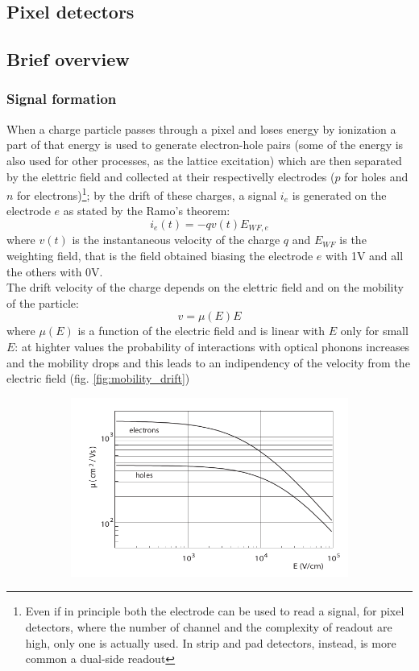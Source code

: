 \label{chip}
\begin{titlepage}

\section{Pixel detectors}

\subsection{Brief overview}
\subsubsection{Signal formation}
When a charge particle passes through a pixel and loses energy by ionization a part of that energy is used to generate electron-hole pairs (some of the energy is also used for other processes, as the lattice excitation) which are then separated by the elettric field and collected at their respectivelly electrodes ($p$ for holes and $n$ for electrons)\footnote{Even if in principle both the electrode can be used to read a signal, for pixel detectors, where the number of channel and the complexity of readout are high, only one is actually used. In strip and pad detectors, instead, is more common a dual-side readout}; by the drift of these charges, a signal $i_e$ is generated on the  electrode $e$ as stated by the Ramo's theorem: 
\begin{equation}
   i_e(t) = -q v(t) E_{WF,e}
\end{equation}
where $v(t)$ is the instantaneous velocity of the charge $q$ and $E_{WF}$ is the weighting field, that is the field obtained biasing the electrode $e$ with 1V and all the others with 0V.\\
The drift velocity of the charge depends on the elettric field and on the mobility of the particle:
\begin{equation}
   v = \mu(E) E
\end{equation}
where $\mu(E)$ is a function of the electric field and is linear with $E$ only for small $E$: at highter values the probability
of interactions with optical phonons increases and the mobility drops and this leads to an indipendency of the velocity from the electric field (fig. \ref{fig:mobility_drift})\\
\begin{figure}[h!]
   \begin{subfigure}{.5\textwidth}
     \centering
     \includegraphics[width=.8\linewidth]{figures/mobility_in_semiconductor.png}

\end{subfigure}
\end{figure}
\end{titlepage}
